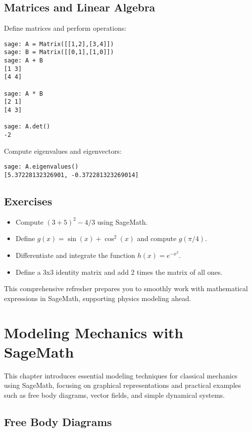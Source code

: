 \documentclass[12pt]{book}
\begin{document}
\section{Matrices and Linear Algebra}

Define matrices and perform operations:

\begin{verbatim}
sage: A = Matrix([[1,2],[3,4]])
sage: B = Matrix([[0,1],[1,0]])
sage: A + B
[1 3]
[4 4]

sage: A * B
[2 1]
[4 3]

sage: A.det()
-2
\end{verbatim}

Compute eigenvalues and eigenvectors:

\begin{verbatim}
sage: A.eigenvalues()
[5.37228132326901, -0.372281323269014]
\end{verbatim}

\section{Exercises}

\begin{itemize}
  \item Compute \((3 + 5)^2 - 4/3\) using SageMath.
  \item Define \(g(x) = \sin(x) + \cos^2(x)\) and compute \(g(\pi/4)\).
  \item Differentiate and integrate the function \(h(x) = e^{-x^2}\).
  \item Define a 3x3 identity matrix and add 2 times the matrix of all ones.
\end{itemize}

This comprehensive refresher prepares you to smoothly work with mathematical expressions in SageMath, supporting physics modeling ahead.

\chapter{Modeling Mechanics with SageMath}

This chapter introduces essential modeling techniques for classical mechanics using SageMath, focusing on graphical representations and practical examples such as free body diagrams, vector fields, and simple dynamical systems.

\section{Free Body Diagrams}
\end{document}
